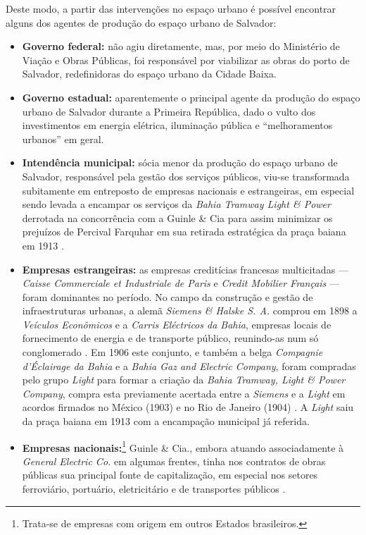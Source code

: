 Deste modo, a partir das intervenções no espaço urbano é possível encontrar alguns dos agentes de produção do espaço urbano de Salvador:

\begin{itemize}
\item \textbf{Governo federal:} não agiu diretamente, mas, por meio do Ministério de Viação e Obras Públicas, foi responsável por viabilizar as obras do porto de Salvador, redefinidoras do espaço urbano da Cidade Baixa.
\item \textbf{Governo estadual:} aparentemente o principal agente da produção do espaço urbano de Salvador durante a Primeira República, dado o vulto dos investimentos em energia elétrica, iluminação pública e ``melhoramentos urbanos'' em geral.
\item \textbf{Intendência municipal:} sócia menor da produção do espaço urbano de Salvador, responsável pela gestão dos serviços públicos, viu-se transformada subitamente em entreposto de empresas nacionais e estrangeiras, em especial sendo levada a encampar os serviços da \textit{Bahia Tramway Light \& Power} derrotada na concorrência com a Guinle \& Cia para assim minimizar os prejuízos de Percival Farquhar em sua retirada estratégica da praça baiana em 1913 \cite[p.~76-89]{CUNHA2011}. 
\item \textbf{Empresas estrangeiras:} as empresas creditícias francesas multicitadas --- \textit{Caisse Commerciale et Industriale de Paris} e \textit{Credit Mobilier Français} --- foram dominantes no período. No campo da construção e gestão de infraestruturas urbanas, a alemã \textit{Siemens \& Halske S. A.} comprou em 1898 a \textit{Veículos Econômicos} e a \textit{Carris Eléctricos da Bahia}, empresas locais de fornecimento de energia e de transporte público, reunindo-as num só conglomerado \cite[p.~36]{CUNHA2011}. Em 1906 este conjunto, e também a belga \textit{Compagnie d'Éclairage da Bahia} e a \textit{Bahia Gaz and Electric Company}, foram compradas pelo grupo \textit{Light} para formar a criação da \textit{Bahia Tramway, Light \& Power Company}, compra esta previamente acertada entre a \textit{Siemens} e a \textit{Light} em acordos firmados no México (1903) e no Rio de Janeiro (1904) \cite[p.~34]{CUNHA2011}. A \textit{Light} saiu da praça baiana em 1913 com a encampação municipal já referida.
\item \textbf{Empresas nacionais:}\footnote{Trata-se de empresas com origem em outros Estados brasileiros.} Guinle \& Cia., embora atuando associadamente à \textit{General Electric Co.} em algumas frentes, tinha nos contratos de obras públicas sua principal fonte de capitalização, em especial nos setores ferroviário, portuário, eletricitário e de transportes públicos \cite[p.~43-44]{CUNHA2011}.

\end{itemize}
